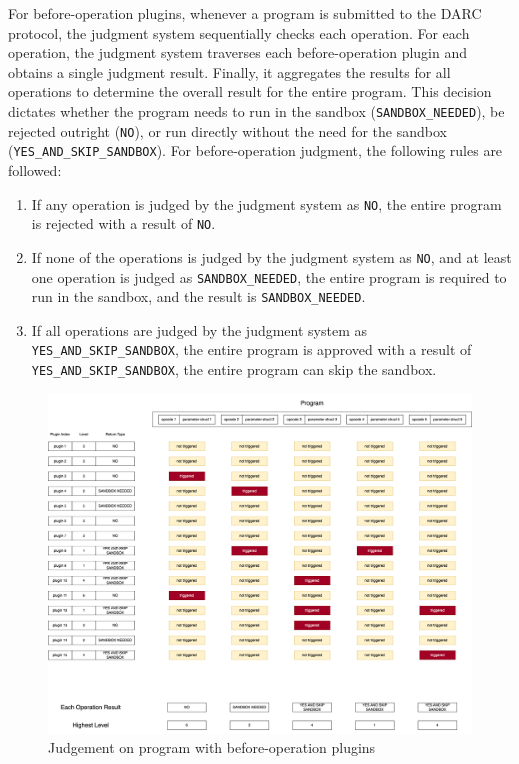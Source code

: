 \documentclass[main.tex]{subfiles}
\begin{document}
For before-operation plugins, whenever a program is submitted to the DARC protocol, the judgment system sequentially checks each operation. For each operation, the judgment system traverses each before-operation plugin and obtains a single judgment result. Finally, it aggregates the results for all operations to determine the overall result for the entire program. This decision dictates whether the program needs to run in the sandbox (\texttt{SANDBOX\_NEEDED}), be rejected outright (\texttt{NO}), or run directly without the need for the sandbox (\texttt{YES\_AND\_SKIP\_SANDBOX}). For before-operation judgment, the following rules are followed:

\begin{enumerate}
    \item If any operation is judged by the judgment system as \texttt{NO}, the entire program is rejected with a result of \texttt{NO}.
    \item If none of the operations is judged by the judgment system as \texttt{NO}, and at least one operation is judged as \texttt{SANDBOX\_NEEDED}, the entire program is required to run in the sandbox, and the result is \texttt{SANDBOX\_NEEDED}.
    \item If all operations are judged by the judgment system as \texttt{YES\_AND\_SKIP\_SANDBOX}, the entire program is approved with a result of \texttt{YES\_AND\_SKIP\_SANDBOX}, the entire program can skip the sandbox.
\end{enumerate}


\begin{figure}
\centering
\includegraphics[width=1\linewidth]{judgement_plugin_levels_before_ops.drawio.png}
\caption{\label{fig:judgement-before-op}Judgement on program with before-operation plugins}
\end{figure}
\end{document}
